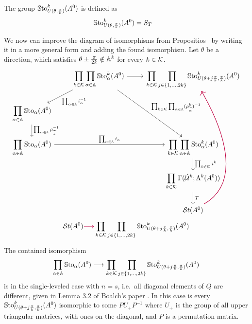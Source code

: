 \begin{rem}
  The group $\operatorname{\mathbb{S}to}_{U(\theta,\frac{\pi}{k})}^k(A^0)$ is defined as
  \begin{align*}
    \operatorname{\mathbb{S}to}_{U(\theta,\frac{\pi}{k})}^k(A^0)&= S_T
  \end{align*}
\end{rem}

\begin{cor}
  We now can improve the diagram of isomorphisms from
  Propositios~\label{prop:decompositionDiagram} by writing it in a more general
  form and adding the found isomorphism.
  Let $\theta$ be a direction, which satisfies
  $\theta\pm\frac{\pi}{2k}\notin\mathbb{A}^k$ for every $k\in\mathcal{K}$.
  \[ \begin{tikzcd}
      &\displaystyle\prod_{k\in\cK}\prod_{\alpha\in\A}\SSto_{\alpha}^{k}(A^0)
       \arrow[dl,"\prod_{\alpha\in\A}i_\alpha^{-1}"]
       \arrow[ddr,
         "\prod_{k\in\cK}\prod_{\alpha\in\A}(\rho_{\tilde\alpha}^k)^{-1}"]
       \arrow[r]
      &\displaystyle\prod_{k\in\cK} \prod_{j\in\{1,\dots,2k\}}
       \SSto_{U(\theta+j\frac{\pi}{k},\frac{\pi}{k})}^k(A^0)
    \\ \displaystyle\prod_{\alpha\in\A} \SSto_{\alpha}(A^0)
        \dar{\prod_{\alpha\in\A}\rho_{\tilde\alpha}^{-1}}
    \\\displaystyle\prod_{\alpha\in\A} \Sto_{\alpha}(A^0)
      \arrow[rr,"\prod_{\alpha\in\A}i_\alpha"]
      &&\displaystyle\prod_{k\in\cK}\prod_{\alpha\in\A}\Sto_{\alpha}^{k}(A^0)
      \dar{\prod_{k\in\cK}i^k}
    \\
      && \displaystyle\prod_{k\in\cK}\Gamma(\dot\cU^k;\Lambda^k(A^0))
      \dar{\cT}
    \\&& \St(A^0)
      \arrow[purple,uuuu,out=30,in=-60,thick]
  \end{tikzcd} \]
  \[
    \mathcal{S}{}t(A^0) \textcolor{purple}{\longrightarrow}
    \prod_{k\in\mathcal{K}} \prod_{j\in\{1,\dots,2k\}}
    \operatorname{\mathbb{S}to}_{U(\theta+j\frac{\pi}{k},\frac{\pi}{k})}^k(A^0)
  \]

  \begin{s-rem}
    The contained isomorphism
    \[
      \prod_{\alpha\in\mathbb{A}}\operatorname{\mathbb{S}to}_{\alpha}(A^0) \longrightarrow
      \prod_{k\in\mathcal{K}} \prod_{j\in\{1,\dots,2k\}}
      \operatorname{\mathbb{S}to}_{U(\theta+j\frac{\pi}{k},\frac{\pi}{k})}^k(A^0)
    \]
    is in the single-leveled case with $n=s$, i.e.\ all diagonal elements of
    $Q$ are different, given in Lemma 3.2 of Boalch's paper
    \cite[Lem.3.2]{boalch}.
    In this case is every
    $\operatorname{\mathbb{S}to}_{U(\theta+j\frac{\pi}{k},\frac{\pi}{k})}^k(A^0)$ isomorphic to some
    $PU_+P^{-1}$ where $U_+$ is the group of all upper triangular matrices,
    with ones on the diagonal, and $P$ is a permutation matrix.
  \end{s-rem}
\end{cor}
